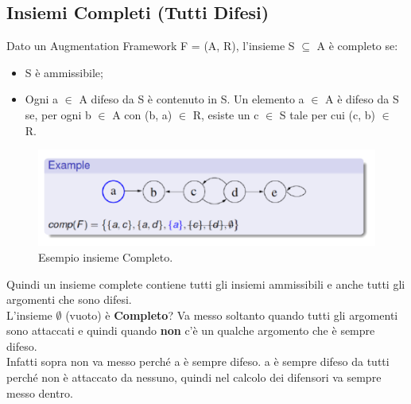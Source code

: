 \subsection{Insiemi Completi (Tutti Difesi)}
Dato un Augmentation Framework F = (A, R), l'insieme S $\subseteq$ A è completo
se:
\begin{itemize}
    \item S è ammissibile;
    \item Ogni a $\in$ A difeso da S è contenuto in S. Un elemento a $\in$ A è
          difeso da S se, per ogni b $\in$ A con (b, a) $\in$ R, esiste un c $\in$ S
          tale per cui (c, b) $\in$ R.
\end{itemize}
\begin{figure}[htp]
    \centering
    \includegraphics[width=12cm, keepaspectratio]{img/Cap6/completo.png}
    \caption{Esempio insieme Completo.}
\end{figure}
Quindi un insieme complete contiene tutti gli insiemi ammissibili e anche tutti
gli argomenti che sono difesi.\\
L'insieme $\emptyset$ (vuoto) è \textbf{Completo}? Va messo
soltanto quando tutti gli argomenti sono attaccati e quindi quando \textbf{non}
c'è un qualche argomento che è sempre difeso.\\
Infatti sopra non va messo
perché a è sempre difeso. a è sempre difeso da tutti perché non è attaccato da
nessuno, quindi nel calcolo dei difensori va sempre messo dentro.
